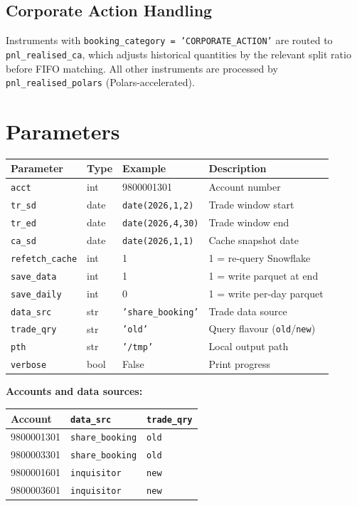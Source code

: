 \documentclass[11pt, a4paper]{article}
\begin{document}
\subsection{Corporate Action Handling}

Instruments with \texttt{booking\_category = 'CORPORATE\_ACTION'} are
routed to \texttt{pnl\_realised\_ca}, which adjusts historical quantities
by the relevant split ratio before FIFO matching. All other instruments
are processed by \texttt{pnl\_realised\_polars} (Polars-accelerated).

\section{Parameters}

\begin{tabular}{llll}
\toprule
Parameter & Type & Example & Description \\
\midrule
\texttt{acct}          & int  & 9800001301        & Account number \\
\texttt{tr\_sd}        & date & \texttt{date(2026,1,2)}  & Trade window start \\
\texttt{tr\_ed}        & date & \texttt{date(2026,4,30)} & Trade window end \\
\texttt{ca\_sd}        & date & \texttt{date(2026,1,1)}  & Cache snapshot date \\
\texttt{refetch\_cache}& int  & 1                 & 1 = re-query Snowflake \\
\texttt{save\_data}    & int  & 1                 & 1 = write parquet at end \\
\texttt{save\_daily}   & int  & 0                 & 1 = write per-day parquet \\
\texttt{data\_src}     & str  & \texttt{'share\_booking'} & Trade data source \\
\texttt{trade\_qry}    & str  & \texttt{'old'}    & Query flavour (\texttt{old}/\texttt{new}) \\
\texttt{pth}           & str  & \texttt{'/tmp'}   & Local output path \\
\texttt{verbose}       & bool & False             & Print progress \\
\bottomrule
\end{tabular}

\medskip
\textbf{Accounts and data sources:}

\begin{tabular}{lll}
\toprule
Account    & \texttt{data\_src}       & \texttt{trade\_qry} \\
\midrule
9800001301 & \texttt{share\_booking}  & \texttt{old} \\
9800003301 & \texttt{share\_booking}  & \texttt{old} \\
9800001601 & \texttt{inquisitor}      & \texttt{new} \\
9800003601 & \texttt{inquisitor}      & \texttt{new} \\
\bottomrule
\end{tabular}
\end{document}
